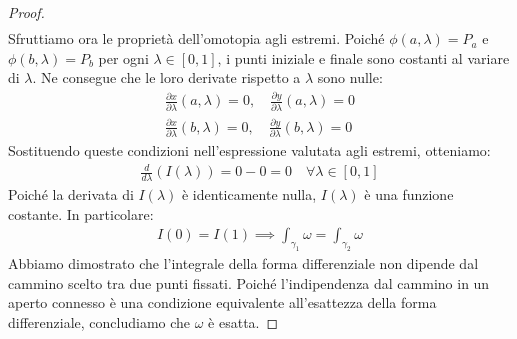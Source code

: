\documentclass[a4paper, oneside]{article}
\begin{document}
\begin{proof}
\begin{gather*}
    \end{gather*}
    Sfruttiamo ora le proprietà dell'omotopia agli estremi. Poiché $\phi(a, \lambda) = P_a$ e $\phi(b, \lambda) = P_b$ per ogni $\lambda \in [0,1]$, i punti iniziale e finale sono costanti al variare di $\lambda$. Ne consegue che le loro derivate rispetto a $\lambda$ sono nulle:
    \begin{gather*}
        \frac{\partial x}{\partial \lambda}(a, \lambda) = 0, \quad \frac{\partial y}{\partial \lambda}(a, \lambda) = 0 \\
        \frac{\partial x}{\partial \lambda}(b, \lambda) = 0, \quad \frac{\partial y}{\partial \lambda}(b, \lambda) = 0
    \end{gather*}
    Sostituendo queste condizioni nell'espressione valutata agli estremi, otteniamo:
    \begin{gather*}
        \frac{d}{d\lambda}\left(I(\lambda)\right) = 0 - 0 = 0 \quad \forall \lambda \in [0,1]
    \end{gather*}
    Poiché la derivata di $I(\lambda)$ è identicamente nulla, $I(\lambda)$ è una funzione costante. In particolare:
    \begin{gather*}
        I(0) = I(1) \implies \int_{\gamma_1} \omega = \int_{\gamma_2} \omega
    \end{gather*}
    Abbiamo dimostrato che l'integrale della forma differenziale non dipende dal cammino scelto tra due punti fissati. Poiché l'indipendenza dal cammino in un aperto connesso è una condizione equivalente all'esattezza della forma differenziale, concludiamo che $\omega$ è esatta.
\end{proof}
\hfill\\
\end{document}
